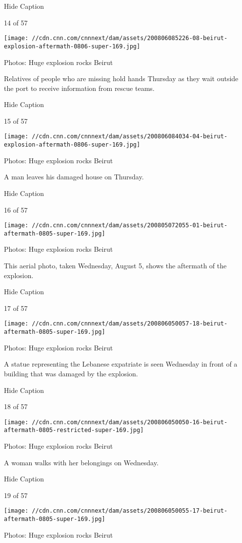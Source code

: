 Hide Caption

14 of 57

\texttt{[image: //cdn.cnn.com/cnnnext/dam/assets/200806085226-08-beirut-explosion-aftermath-0806-super-169.jpg]}

Photos: Huge explosion rocks Beirut

Relatives of people who are missing hold hands Thursday as they wait
outside the port to receive information from rescue teams.

Hide Caption

15 of 57

\texttt{[image: //cdn.cnn.com/cnnnext/dam/assets/200806084034-04-beirut-explosion-aftermath-0806-super-169.jpg]}

Photos: Huge explosion rocks Beirut

A man leaves his damaged house on Thursday.

Hide Caption

16 of 57

\texttt{[image: //cdn.cnn.com/cnnnext/dam/assets/200805072055-01-beirut-aftermath-0805-super-169.jpg]}

Photos: Huge explosion rocks Beirut

This aerial photo, taken Wednesday, August 5, shows the aftermath of the
explosion.

Hide Caption

17 of 57

\texttt{[image: //cdn.cnn.com/cnnnext/dam/assets/200806050057-18-beirut-aftermath-0805-super-169.jpg]}

Photos: Huge explosion rocks Beirut

A statue representing the Lebanese expatriate is seen Wednesday in front
of a building that was damaged by the explosion.

Hide Caption

18 of 57

\texttt{[image: //cdn.cnn.com/cnnnext/dam/assets/200806050050-16-beirut-aftermath-0805-restricted-super-169.jpg]}

Photos: Huge explosion rocks Beirut

A woman walks with her belongings on Wednesday.

Hide Caption

19 of 57

\texttt{[image: //cdn.cnn.com/cnnnext/dam/assets/200806050055-17-beirut-aftermath-0805-super-169.jpg]}

Photos: Huge explosion rocks Beirut

